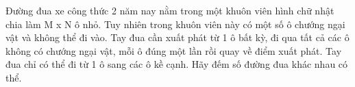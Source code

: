 Đường đua xe công thức 2 năm nay nằm trong một khuôn viên hình chữ nhật chia làm M x N ô nhỏ. Tuy nhiên trong khuôn viên này có một số ô chướng ngại vật và không thể đi vào. Tay đua cần xuất phát từ 1 ô bất kỳ, đi qua tất cả các ô không có chướng ngại vật, mỗi ô đúng một lần rồi quay về điểm xuất phát. Tay đua chỉ có thể đi từ 1 ô sang các ô kề cạnh. Hãy đếm số đường đua khác nhau có thể.